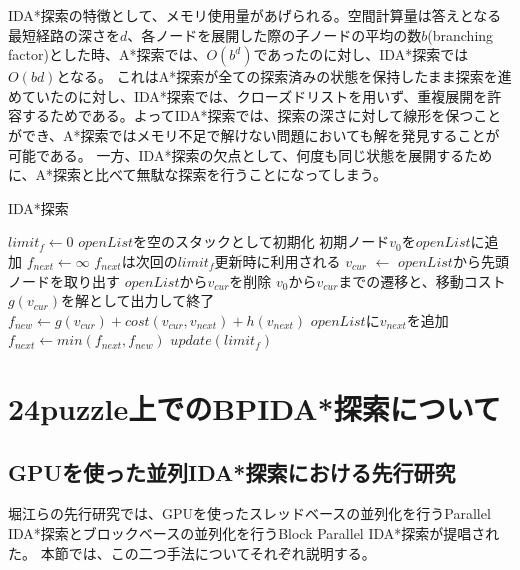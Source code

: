\documentclass[a4paper,11pt,oneside,openany]{jsbook}
\begin{document}
IDA*探索の特徴として、メモリ使用量があげられる。空間計算量は答えとなる最短経路の深さを$d$、各ノードを展開した際の子ノードの平均の数$b$(branching factor)とした時、A*探索では、$O(b^d)$であったのに対し、IDA*探索では$O(bd)$となる。
これはA*探索が全ての探索済みの状態を保持したまま探索を進めていたのに対し、IDA*探索では、クローズドリストを用いず、重複展開を許容するためである。よってIDA*探索では、探索の深さに対して線形を保つことができ、A*探索ではメモリ不足で解けない問題においても解を発見することが可能である。
一方、IDA*探索の欠点として、何度も同じ状態を展開するために、A*探索と比べて無駄な探索を行うことになってしまう。

\newpage
\begin{algorithm}
\caption{IDA*探索}
\label{alg:pbnf}
\begin{algorithmic}[1]
\State $limit_f \leftarrow 0$
    \State $openList$を空のスタックとして初期化
    \State 初期ノード$v_0$を$openList$に追加
    \State $f_{next} \leftarrow \infty$
    \State $f_{next}$は次回の$limit_f$更新時に利用される 
        \State $v_{cur}$ $\leftarrow$ $openList$から先頭ノードを取り出す
        \State $openList$から$v_{cur}$を削除
            \State $v_0$から$v_{cur}$までの遷移と、移動コスト$g(v_{cur})$を解として出力して終了
        \EndIf
            \State $f_{new} \leftarrow g(v_{cur}) + cost(v_{cur}, v_{next}) + h(v_{next})$
                \State $openList$に$v_{next}$を追加
            \Else
                \State $f_{next} \leftarrow min(f_{next}, f_{new})$
            \EndIf
        \EndFor
    \EndWhile
    \State $update(limit_f)$
\EndWhile
\end{algorithmic}
\end{algorithm}
\newpage



\chapter{24puzzle上でのBPIDA*探索について}
\section{GPUを使った並列IDA*探索における先行研究}
堀江らの先行研究\cite{HA17}では、GPUを使ったスレッドベースの並列化を行うParallel IDA*探索とブロックベースの並列化を行うBlock Parallel IDA*探索が提唱された。
本節では、この二つ手法についてそれぞれ説明する。
\end{document}
